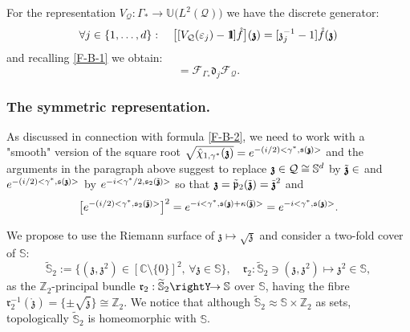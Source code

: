\documentclass[12pt]{article}
\theoremstyle{definition}
\def\Z{\mathbb{Z}}
\def\Sb{\mathbb{S}}
\def\T{\mathcal{Q}}
\def\bb1{{\rm{1}\hspace{-3pt}\mathbf{l}}}
\def\p{\mathfrak{p}}
\def\s{\mathfrak{s}}
\def\bz{\mathfrak{z}\hspace*{-4pt}\mathfrak{z}}
\def\dd{\mathfrak{d}}
\def\z{\mathfrak{z}}
\def\repi{\rightY\hspace*{-4pt}\rightarrow}
\def\tbz{\tilde{\bz}}
\def\beq{\begin{equation}}
\def\eeq{\end{equation}}
\def\z{\mathfrak{z}}
\def\Sd{\mathbb{S}^d}
\def\mf{\mathring{f}}
\numberwithin{equation}{section}
\begin{document}
For the representation $V_{\T}:\Gamma_*\rightarrow\mathbb{U}\big(L^2(\T)\big)$ we have the discrete generator:
\beq
\forall{j}\in\{1,\ldots,d\}:\quad\big[[V_{\T}(\varepsilon_j)-\bb1]\mf\big](\bz)=[\z_j^{-1}-1]\mf(\bz)
\eeq
and recalling \eqref{F-B-1} we obtain:
\beq
[V_{\T}(\varepsilon_j)-\bb1]=\mathcal{F}_{\Gamma_*}\dd_j\mathcal{F}_{\T}.
\eeq

\subsubsection{The symmetric representation.}

As discussed in connection with formula \eqref{F-B-2}, we need to work with a "smooth" version of the square root $\sqrt{\hat{\chi}_{1,\gamma^*}(\bz)}=e^{-(i/2)<\gamma^*,\s(\bz)>}$ and the arguments in the paragraph above suggest to replace $\bz\in\T\cong\Sd$ by $\tilde{\bz}\in$ and $e^{-(i/2)<\gamma^*,\s(\bz)>}$ by $e^{-i<\gamma^*/2,\s_2(\tilde{\bz})>}$ so that $\bz=\tilde{\p}_2(\tilde{\bz})=\tilde{\bz}^2$ and
\beq
\big[e^{-(i/2)<\gamma^*,\s_2(\tilde{\bz})>}\big]^2=e^{-i<\gamma^*,\s(\bz)+\kappa(\tbz)>}=e^{-i<\gamma^*,\s(\bz)>}.
\eeq

We propose to use the Riemann surface of $\z\mapsto\sqrt{\z}$ and consider a two-fold cover of $\Sb$:
\beq\label{D-Stilde2}
\widetilde{\mathbb{S}}_2:=\big\{(\z,\z^2)\in[\mathbb{C}\setminus\{0\}]^2,\,\forall\z\in\mathbb{S}\big\},\quad\mathfrak{r}_2:\widetilde{\mathbb{S}}_2\ni(\z,\z^2)\mapsto\z^2\in\mathbb{S},
\eeq
as the $\Z_2$-principal bundle $\mathfrak{r}_2:\widetilde{\mathbb{S}}_2\repi\mathbb{S}$ over $\mathbb{S}$,
having the fibre $\mathfrak{r}_2^{-1}(\mathring{\z})=\{\pm\sqrt{\mathring{\z}}\}\cong\Z_2$. We notice that although $\widetilde{\mathbb{S}}_2\approx\mathbb{S}\times\Z_2$ as sets, topologically $\widetilde{\mathbb{S}}_2$ is homeomorphic with $\mathbb{S}$. 
\end{document}
